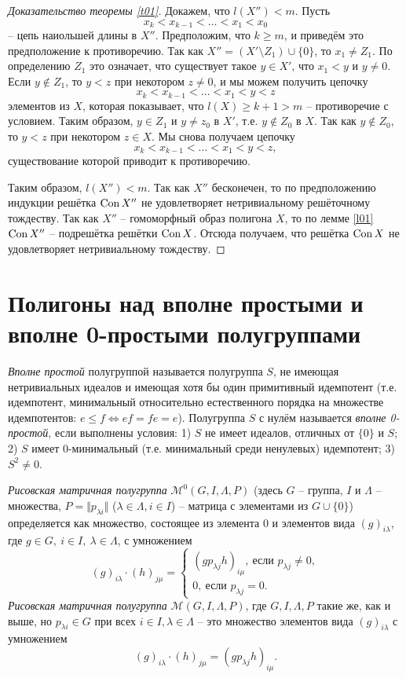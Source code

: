 \documentclass[a4paper]{article}
\newcommand{\Con}{\textnormal{Con}\, }
\begin{document}
\begin{proof}[Доказательство теоремы \ref{t01}]
		\par Докажем, что $l(X'') < m$. Пусть $$ x_k < x_{k-1} < \ldots < x_1 < x_0 $$ -- цепь наиольшей длины в $X''$. Предположим, что $k \geqslant m$, и приведём это предположение к противоречию. Так как $X'' = (X' \setminus Z_1) \cup \{0\}$, то $x_1 \neq Z_1$. По определению $Z_1$ это означает, что существует такое $y \in X'$, что $x_1 < y$ и $y \neq 0$. Если $y \notin Z_1$, то $y < z$ при некотором $z \neq 0$, и мы можем получить цепочку $$ x_k < x_{k-1} < \ldots < x_1 < y < z $$ элементов из $X$, которая показывает, что $l(X) \geqslant k+1 > m$ -- противоречие с условием. Таким образом, $y \in Z_1$ и $y \neq z_0$ в $X'$, т.е. $y \notin Z_0$ в $X$. Так как $y \notin Z_0$, то $y < z$ при некотором $z \in X$. Мы снова получаем цепочку $$ x_k < x_{k-1} < \ldots < x_1 < y < z, $$ существование которой приводит к противоречию.
		\par Таким образом, $l(X'') < m$. Так как $X''$ бесконечен, то по предположению индукции решётка $\Con X''$ не удовлетворяет нетривиальному решёточному тождеству. Так как $X''$ -- гомоморфный образ полигона $X$, то по лемме \ref{l01} $\Con X''$ -- подрешётка решётки $\Con X$. Отсюда получаем, что решётка $\Con X$ не удовлетворяет нетривиальному тождеству.
	\end{proof}
	
	\section*{Полигоны над вполне простыми и вполне 0-простыми полугруппами}
	
	\textit{Вполне простой} полугруппой называется полугруппа $S$, не имеющая нетривиальных идеалов и имеющая хотя бы один примитивный идемпотент (т.е. идемпотент, минимальный относительно естественного порядка на множестве идемпотентов: $e \leqslant f \Leftrightarrow  ef=fe=e$). Полугруппа $S$ с нулём называется \textit{вполне 0-простой}, если выполнены условия: 1) $S$ не имеет идеалов, отличных от $\{0\}$ и $S$; 2) $S$ имеет 0-минимальный (т.е. минимальный среди ненулевых) идемпотент; 3) $S^2 \neq 0$.
	\par \textit{Рисовская матричная полугруппа} $\mathcal{M}^0(G,I,\Lambda,P)$ (здесь $G$ -- группа, $I$ и $\Lambda$ -- множества, $P=\Vert p_{\lambda i} \Vert$ ($\lambda \in \Lambda, i \in I$) -- матрица с элементами из $G \cup \{0\}$) определяется как множество, состоящее из элемента 0 и элементов вида $(g)_{i\lambda}$, где $g \in G,\ i \in I,\ \lambda \in \Lambda$, с умножением
		$$ (g)_{i\lambda} \cdot (h)_{j\mu} = 
			\begin{cases}
				(gp_{\lambda j}h)_{i\mu},\ \text{если } p_{\lambda j} \neq 0,\\
				0,\ \text{если } p_{\lambda j} = 0.
			\end{cases}
		$$
	\textit{Рисовская матричная полугруппа} $\mathcal{M}(G,I,\Lambda,P)$, где $G,I,\Lambda,P$ такие же, как и выше, но $p_{\lambda i} \in G$ при всех $i \in I,\lambda \in \Lambda$ -- это множество элементов вида $(g)_{i\lambda}$ с умножением $$ (g)_{i\lambda} \cdot (h)_{j\mu} = (gp_{\lambda j}h)_{i\mu}. $$
	
\end{document}
